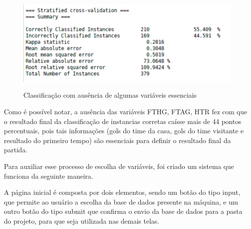 \begin{figure}[htbp]
	\begin{center}
		\includegraphics[width=.9\linewidth]{imagens/dados_incompletos.png}\\
	\end{center}
	\caption[Classificação com ausência de algumas variáveis essenciais]{Classificação com ausência de algumas variáveis essenciais}
	\label{fig:logo}
\end{figure}


Como é possível notar, a ausência das variáveis FTHG, FTAG, HTR fez com que o resultado final da classificação de instancias corretas caísse mais de 44 pontos percentuais, pois tais informações (gols do time da casa, gols do time visitante e resultado do primeiro tempo) são essenciais para definir o resultado final da partida.

Para auxiliar esse processo de escolha de variáveis, foi criado um sistema que funciona da seguinte maneira.

A página inicial é composta por dois elementos, sendo um botão do tipo input, que permite ao usuário a escolha da base de dados presente na máquina, e um outro botão do tipo submit que confirma o envio da base de dados para a pasta do projeto, para que seja utilizada nas demais telas.

